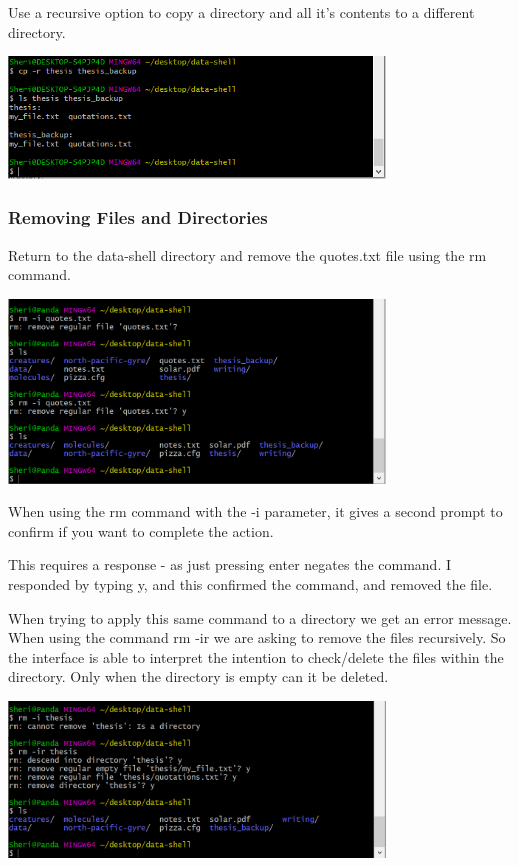 \documentclass{article}
\begin{document}
Use a recursive option to copy a directory and all it's contents to a different directory.

\includegraphics[width=10cm]{Images/GitBash_021.PNG}

\subsubsection{Removing Files and Directories}
Return to the data-shell directory and remove the quotes.txt file using the rm command.

\includegraphics[width=10cm]{Images/GitBash_025.PNG}

\label{Unix rm -i confrimation}
When using the rm command with the -i parameter, it gives a second prompt to confirm if you want to complete the action. 

This requires a response - as just pressing enter negates the command. I responded by typing y, and this confirmed the command, and removed the file.

When trying to apply this same command to a directory we get an error message.
When using the command rm -ir we are asking to remove the files recursively. So the interface is able to interpret the intention to check/delete the files within the directory. Only when  the directory is empty can it be deleted.

\includegraphics[width=10cm]{Images/GitBash_026.PNG}
\end{document}
